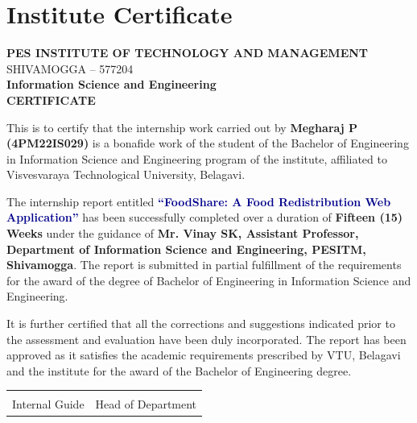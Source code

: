\documentclass[12pt,a4paper]{report}
\newcommand{\studentname}{Megharaj P}
\newcommand{\usn}{4PM22IS029}
\newcommand{\branch}{Information Science and Engineering}
\newcommand{\internalguide}{Vinay SK}
\newcommand{\projecttitle}{FoodShare}
\begin{document}
\clearpage
{}

\chapter*{Institute Certificate}

\vspace*{0.8cm}
\begin{center}
{\Large \textbf{PES INSTITUTE OF TECHNOLOGY AND MANAGEMENT}}\\
{\small SHIVAMOGGA -- 577204}\\[0.4cm]
{\large \textbf{\branch}}\\[0.8cm]
{\Large \textbf{CERTIFICATE}}\\[0.8cm]
\end{center}

This is to certify that the internship work carried out by \textbf{\studentname{} (\usn)} is a bonafide work of the student of the Bachelor of Engineering in \branch{} program of the institute, affiliated to Visvesvaraya Technological University, Belagavi.

The internship report entitled \textbf{\textcolor{darkblue}{``\projecttitle: A Food Redistribution Web Application''}} has been successfully completed over a duration of \textbf{Fifteen (15) Weeks} under the guidance of \textbf{Mr. \internalguide, Assistant Professor, Department of Information Science and Engineering, PESITM, Shivamogga}. The report is submitted in partial fulfillment of the requirements for the award of the degree of Bachelor of Engineering in \branch.

It is further certified that all the corrections and suggestions indicated prior to the assessment and evaluation have been duly incorporated. The report has been approved as it satisfies the academic requirements prescribed by VTU, Belagavi and the institute for the award of the Bachelor of Engineering degree.

\vspace{2cm}
\begin{center}
\begin{tabular}{>{\centering\arraybackslash}p{6cm} >{\centering\arraybackslash}p{6cm}}
\hrulefill & \hrulefill \\[0.3cm]
Internal Guide & Head of Department \\
\end{tabular}
\end{center}
\end{document}
